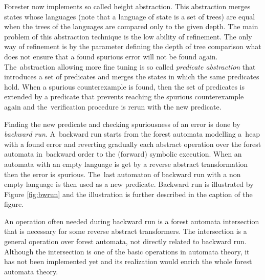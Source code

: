 \documentclass[fleqn,11pt]{ExcelAtFIT} %
\begin{document}
Forester now implements so called height abstraction.
This abstraction merges states whose languages (note that a language of state is a set of trees) are equal
when the trees of the languages are compared only to the given depth.
The main problem of this abstraction technique is the low ability of refinement.
The only way of refinement is by the parameter defining the depth of tree comparison
what does not ensure that a found spurious error will not be found again.
The~abstraction allowing more fine tuning is so called \emph{predicate abstraction} \cite{artmc}
that introduces a set of predicates and merges the states in which the same predicates hold.
When a spurious counterexample is found, then the set of predicates is extended by
a predicate that prevents reaching the spurious counterexample again
and the~verification procedure is rerun with the new predicate.

Finding the new predicate and checking spuriousness of an error is done by \emph{backward run}.
A~backward run starts from the forest automata modelling a~heap with a found error and
reverting gradually each abstract operation over the forest automata
in~backward order to the (forward) symbolic execution.
When an automata with an empty language is get by a reverse abstract transformation then the error is spurious.
The~last automaton of backward run with a non empty language is then used as a new predicate.
Backward run is illustrated by Figure \ref{fig:bwrun} and the illustration
is further described in the caption of the figure.

An operation often needed during backward run is a forest automata intersection
that is necessary for some reverse abstract transformers.
The intersection is a general operation over forest automata,
not directly related to backward run.
Although the intersection is one of the basic operations in automata theory,
it has not been implemented yet and its realization would enrich the whole forest automata theory.
\begin{comment}
The intersection is sometimes needed to be done during a backward run between a forest automaton from forward run
and the~last forest automaton from backward run.
The~resulting forest automaton is then further used in backward run after an application
of the corresponding reverse abstract transformer.
This is illustrated by Figure~\ref{fig:bwrun}.
Consider an oval representing the language $L(X_{k+1})$ which is the language
of a forest automaton in the backward run and an abstract transformer $\beta$ such that $\beta(L(M^{\alpha}_{k})) = L(M_{k+1})$.
The next state in backward run with the forest automaton language $L(X_{k})$ is obtained
by an application of the reverse abstract transformer $\beta^{-1}$ (illustrated by the doted lines) on the intersection
(represented by the red and the orange area) of the language $L(X_{k+1})$ from backward run 
and the language $L(M^{\alpha}_{k+1})$ from forward run.
It is not necessary to do the intersection before each reverse abstract transformer in Forester
but it is needed for a few of them.
\end{comment}
\end{document}
